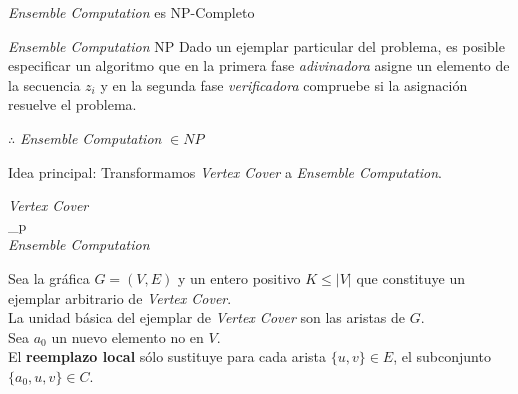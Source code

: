 \documentclass{beamer}
\begin{document}

\begin{frame}{\textit{Ensemble Computation} es NP-Completo}
    \begin{block}{\textit{Ensemble Computation} \in NP}
            Dado un ejemplar particular del problema, es posible especificar un algoritmo que en la primera fase \textit{adivinadora} asigne un elemento de la secuencia $z_i$ y en la segunda fase \textit{verificadora} compruebe si la asignación resuelve el problema.
    \end{block}
    \begin{flushright}
        $\therefore$ \textit{Ensemble Computation} $\in NP$
    \end{flushright}
\end{frame}


\begin{frame}
    \begin{block}{Idea principal:}
        Transformamos \textit{Vertex Cover} a \textit{Ensemble Computation}.
    \end{block}
    \begin{center}
        \huge{\textit{Vertex Cover}} \\
        \huge{\propto_p} \\
        \huge{\textit{Ensemble Computation}}
    \end{center}
\end{frame}


\begin{frame}
    Sea la gráfica $G=(V,E)$ y un entero positivo $K \leq |V|$ que constituye un ejemplar arbitrario de \textit{Vertex Cover}.\\
    
    La unidad básica del ejemplar de \textit{Vertex Cover} son las aristas de $G$. \\
    
    Sea $a_0$ un nuevo elemento no en $V$. \\
    
    El \textbf{reemplazo local} sólo sustituye para cada arista $\{u,v\} \in E$, el subconjunto $\{a_0,u,v\} \in C$.
\end{frame}

\end{document}
